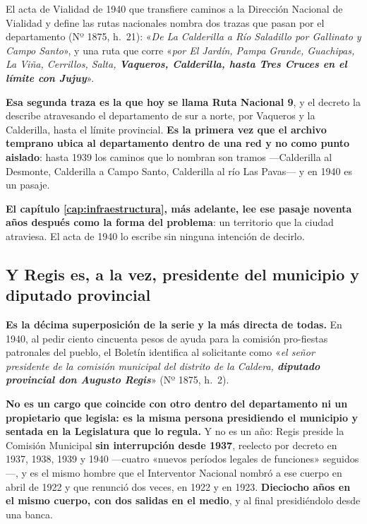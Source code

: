 \begin{cautela}
El acta de Vialidad de 1940 que transfiere caminos a la Dirección Nacional de Vialidad y define las rutas nacionales nombra dos trazas que
pasan por el departamento (Nº 1875, h.\ 21): «\textit{De La Calderilla a Río
Saladillo por Gallinato y Campo Santo}», y una ruta que corre «\textit{por El
Jardín, Pampa Grande, Guachipas, La Viña, Cerrillos, Salta, \textbf{Vaqueros,
Calderilla, hasta Tres Cruces en el límite con Jujuy}}».

\begin{cautela}
\textbf{Esa segunda traza es la que hoy se llama Ruta Nacional 9}, y el
decreto la describe atravesando el departamento de sur a norte, por Vaqueros y
la Calderilla, hasta el límite provincial. \textbf{Es la primera vez que el
archivo temprano ubica al departamento dentro de una red y no como punto
aislado}: hasta 1939 los caminos que lo nombran son tramos ---Calderilla al
Desmonte, Calderilla a Campo Santo, Calderilla al río Las Pavas--- y en 1940 es
un pasaje.

\textbf{El capítulo \ref{cap:infraestructura}, más adelante, lee ese pasaje noventa años
después como la forma del problema}: un territorio que la ciudad atraviesa. El
acta de 1940 lo escribe sin ninguna intención de decirlo.
\end{cautela}

\subsection*{Y Regis es, a la vez, presidente del municipio y diputado provincial}

\begin{cautela}
\textbf{Es la décima superposición de la serie y la más directa de todas.} En
1940, al pedir ciento cincuenta pesos de ayuda para la comisión pro-fiestas
patronales del pueblo, el Boletín identifica al solicitante como
«\textit{el señor presidente de la comisión municipal del distrito de la
Caldera, \textbf{diputado provincial don Augusto Regis}}»
(Nº 1875, h.\ 2).

\textbf{No es un cargo que coincide con otro dentro del departamento ni un
propietario que legisla: es la misma persona presidiendo el municipio y
sentada en la Legislatura que lo regula.} Y no es un año: Regis preside la
Comisión Municipal \textbf{sin interrupción desde 1937}, reelecto por decreto en
1937, 1938, 1939 y 1940 ---cuatro «nuevos períodos legales de funciones»
seguidos---, y es el mismo hombre que el Interventor Nacional nombró a ese
cuerpo en abril de 1922 y que renunció dos veces, en 1922 y en 1923.
\textbf{Dieciocho años en el mismo cuerpo, con dos salidas en el medio}, y al
final presidiéndolo desde una banca.
\end{cautela}


\end{cautela}
